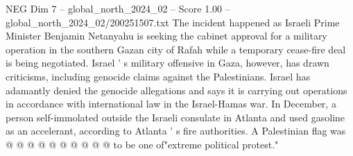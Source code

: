 \begin{textsample}{NEG Dim 7 – global\_north\_2024\_02 – Score 1.00 – global\_north\_2024\_02/200251507.txt}
The incident happened as Israeli Prime Minister Benjamin Netanyahu is seeking the cabinet approval for a military operation in the southern Gazan city of Rafah while a temporary cease-fire deal is being negotiated.
Israel ' s military offensive in Gaza, however, has drawn criticisms, including genocide claims against the Palestinians.
Israel has adamantly denied the genocide allegations and says it is carrying out operations in accordance with international law in the Israel-Hamas war.
In December, a person self-immolated outside the Israeli consulate in Atlanta and used gasoline as an accelerant, according to Atlanta ' s fire authorities.
A Palestinian flag was @ @ @ @ @ @ @ @ @ @ to be one of"extreme political protest."

\end{textsample}
